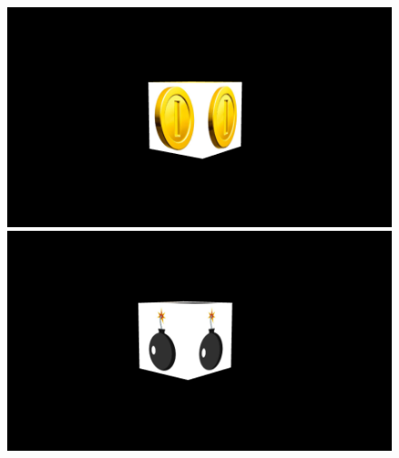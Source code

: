 \documentclass[14pt]{article}
\begin{document}
\begin{figure}[H]
\begin{minipage}[t]{0.4\textwidth}
\center
\includegraphics[width=\textwidth]{images/coin.png}
\end{minipage}
\hfill
\begin{minipage}[t]{0.4\textwidth}
\center
\includegraphics[width=\textwidth]{images/cannonball.png}
\end{minipage}
\label{img:lootBoxTypes2}
\end{figure}
\end{document}
